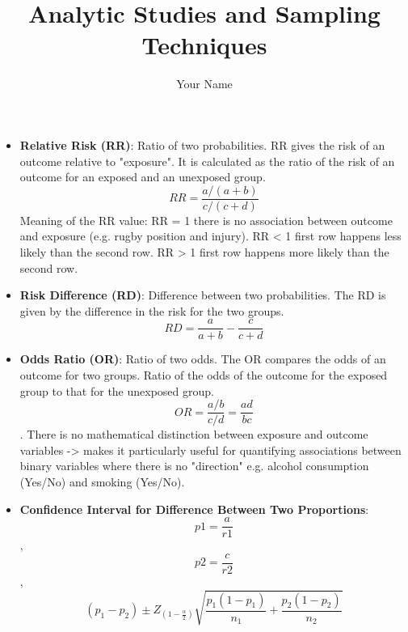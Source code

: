\documentclass[12pt]{article}
\author{Your Name}
\title{Analytic Studies and Sampling Techniques}
\date{}
\begin{document}
\pagestyle{fancy}

\begin{itemize}
\item \textbf{Relative Risk (RR)}: Ratio of two probabilities. RR gives the risk of an outcome relative to "exposure". It is calculated as the ratio of the risk of an outcome for an exposed and an unexposed group. $$RR = \frac{a/(a+b)}{c/(c+d)}$$
Meaning of the RR value: RR = 1 there is no association between outcome and exposure (e.g. rugby position and injury). RR < 1 first row happens less likely than the second row. RR > 1 first row happens more likely than the second row.
\item \textbf{Risk Difference (RD)}: Difference between two probabilities. The RD is given by the difference in the risk for the two groups. $$RD = \frac{a}{a + b} - \frac{c}{c + d}$$
\item \textbf{Odds Ratio (OR)}: Ratio of two odds. The OR compares the odds of an outcome for two groups. Ratio of the odds of the outcome for the exposed group to that for the unexposed group. $$OR = \frac{a/b}{c/d} = \frac{ad}{bc}$$. There is no mathematical distinction between exposure and outcome variables -> makes it particularly useful for quantifying associations between binary variables where there is no "direction" e.g. alcohol consumption (Yes/No) and smoking (Yes/No).
\item \textbf{Confidence Interval for Difference Between Two Proportions}: $$p1 = \frac{a}{r1}$$, $$p2 = \frac{c}{r2}$$, $$(p_1 - p_2) \pm Z_{(1 - \frac{\alpha}{2})} \sqrt{\frac{p_1(1-p_1)}{n_1} + \frac{p_2(1-p_2)}{n_2}}$$


\end{itemize}
\end{document}
